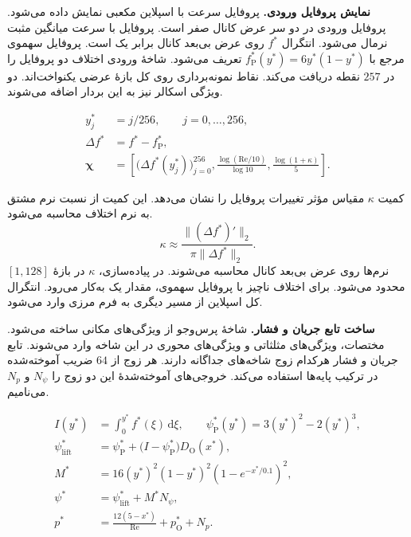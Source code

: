 \textbf{نمایش پروفایل ورودی.}
پروفایل سرعت با اسپلاین مکعبی نمایش داده می‌شود.
پروفایل ورودی در دو سر عرض کانال صفر است.
پروفایل با سرعت میانگین مثبت نرمال می‌شود.
انتگرال $f^*$ روی عرض بی‌بعد کانال برابر یک است.
پروفایل سهموی مرجع با $f_{\mathrm P}^*(y^*)=6y^*(1-y^*)$ تعریف می‌شود.
شاخهٔ ورودی اختلاف دو پروفایل را در $257$ نقطه دریافت می‌کند.
نقاط نمونه‌برداری روی کل بازهٔ عرضی یکنواخت‌اند.
دو ویژگی اسکالر نیز به این بردار اضافه می‌شوند.

\begin{equation}
\begin{aligned}
y_j^*&=j/256,\qquad j=0,\ldots,256,\\
\Delta f^*&=f^*-f_{\mathrm P}^*,\\
\boldsymbol\chi&=
\left[
\big(\Delta f^*(y_j^*)\big)_{j=0}^{256},
\frac{\log(\mathrm{Re}/10)}{\log 10},
\frac{\log(1+\kappa)}{5}
\right].
\end{aligned}
\label{eq:forward-flow-branch-input}
\end{equation}

کمیت $\kappa$ مقیاس مؤثر تغییرات پروفایل را نشان می‌دهد.
این کمیت از نسبت نرم مشتق به نرم اختلاف محاسبه می‌شود.
\[
\kappa \approx \frac{\|(\Delta f^*)'\|_2}{\pi\|\Delta f^*\|_2}.
\]
نرم‌ها روی عرض بی‌بعد کانال محاسبه می‌شوند.
در پیاده‌سازی، $\kappa$ در بازهٔ $[1,128]$ محدود می‌شود.
برای اختلاف ناچیز با پروفایل سهموی، مقدار یک به‌کار می‌رود.
انتگرال کل اسپلاین از مسیر دیگری به فرم مرزی وارد می‌شود.

\textbf{ساخت تابع جریان و فشار.}
شاخهٔ پرس‌وجو از ویژگی‌های مکانی ساخته می‌شود.
مختصات، ویژگی‌های مثلثاتی و ویژگی‌های محوری در این شاخه وارد می‌شوند.
تابع جریان و فشار هرکدام زوج شاخه‌های جداگانه دارند.
هر زوج از $64$ ضریب آموخته‌شده در ترکیب پایه‌ها استفاده می‌کند.
خروجی‌های آموخته‌شدهٔ این دو زوج را $N_\psi$ و $N_p$ می‌نامیم.

\begin{equation}
\begin{aligned}
I(y^*)&=\int_0^{y^*} f^*(\xi)\,\mathrm d\xi,\qquad
\psi_{\mathrm P}^*(y^*)=3(y^*)^2-2(y^*)^3,\\
\psi_{\mathrm{lift}}^*
&=\psi_{\mathrm P}^*+\big(I-\psi_{\mathrm P}^*\big)D_{\mathrm O}(x^*),\\
M^*&=16(y^*)^2(1-y^*)^2(1-e^{-x^*/0.1})^2,\\
\psi^*&=\psi_{\mathrm{lift}}^*+M^*N_\psi,\\
p^*&=\frac{12(5-x^*)}{\mathrm{Re}}+p_{\mathrm O}^*+N_p.
\end{aligned}
\label{eq:forward-flow-lift}
\end{equation}

